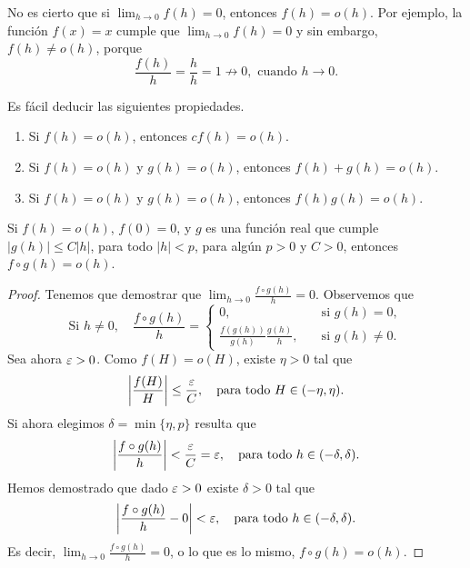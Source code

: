 \begin{remark}
    No es cierto que si $\lim_{h\to0}f(h) = 0$, entonces $f(h) = o(h)$.
    Por ejemplo, la función $f(x) = x$ cumple que $\lim_{h\to0}f(h) = 0$ y sin embargo, $f(h) \neq o(h)$, porque
    \[
    \frac{f(h)}{h} = \frac hh = 1 \not\to 0, \text{ cuando $h\to 0$}.
    \]
\end{remark}


Es fácil deducir las siguientes propiedades.

\begin{theorem}[Propiedades]
    \begin{enumerate}[{\bf(a)}]
        \item Si $f(h)=o(h)$, entonces $cf(h) = o(h)$.
        \item Si $f(h)=o(h)$ y $g(h) = o(h)$, entonces $f(h)+g(h) = o(h)$.
        \item Si $f(h)=o(h)$ y $g(h) = o(h)$, entonces $f(h)g(h) = o(h)$.
    \end{enumerate}
\end{theorem}


\begin{theorem}
Si $f(h)=o(h)$, $f(0)=0$, y $g$ es una función real que cumple
$|g(h)| \le C|h|$, para todo $|h|<p$, para algún $p>0$ y $C>0$, entonces $f\circ g(h) = o(h)$.
\end{theorem}

\begin{proof}
    Tenemos que demostrar que $\lim_{h\to0} \frac{f\circ g(h)}{h} = 0$.
    Observemos que
    \[
    \text{Si $h \neq 0$}, \quad
    \frac{f\circ g(h)}{h} = \begin{cases}
        0,\quad&\text{si }g(h) = 0,\\
        \frac{f(g(h))}{g(h)} \frac{g(h)}{h}, \quad&\text{si }g(h) \neq 0.
    \end{cases}
    \]
    Sea ahora $\varepsilon > 0$. Como $f(H)=o(H)$, existe $\eta > 0$ tal que
    \[
    \left| \frac{f(H)}{H} \right| \le \frac{\varepsilon}{C}, \quad\text{para todo } H \in (-\eta,\eta) .
    \]
    Si ahora elegimos $\delta = \min\{\eta,p\}$ resulta que
    \[
    \left| \frac{f\circ g(h)}{h} \right| < \frac{\varepsilon}C = \varepsilon, \quad\text{para todo }h \in (-\delta,\delta).
    \]
    Hemos demostrado que dado $\varepsilon > 0$ existe $\delta > 0$ tal que
    \[
    \left| \frac{f\circ g(h)}{h} - 0 \right| < \varepsilon, \quad\text{para todo }h \in (-\delta,\delta).
    \]
    Es decir, $\lim_{h \to 0} \frac{f\circ g(h)}{h} = 0$, o lo que es lo mismo, $f\circ g(h) = o(h)$.
\end{proof}


